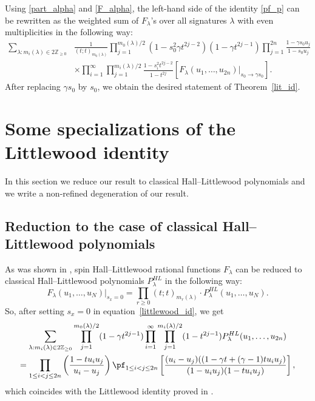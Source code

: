 Using \eqref{part_alpha} and \eqref{F_alpha}, the left-hand side of the identity \eqref{pf_p} can be rewritten as the weighted sum of $F_{\lambda}$'s over all signatures $\lambda$ with even multiplicities in the following way:
\begin{equation*}
\begin{split}
\sum_{\lambda: m_{i}(\lambda) \in 2 \mathbb{Z}_{\geq 0}} &\frac{1}{( t; t)_{m_{0}(\lambda)}} \prod_{j = 1}^{m_{0}(\lambda) / 2} (1 - s_{0}^2 \gamma t^{2j - 2})(1 - \gamma t^{2j-1}) \prod_{j=1}^{2n} \frac{1 - \gamma s_0 u_j}{1 - s_0 u_j}
\\
&\times \prod_{i = 1}^{\infty} \prod_{j = 1}^{m_{i}(\lambda) / 2} \frac{1 - s_{i}^2 t^{2j - 2}}{1 - t^{2j}} \left[F_{\lambda} (u_1, \dots, u_{2n})\Big\vert_{\text{$s_0\to \gamma s_0$}}\right].
\end{split}
\end{equation*}
After replacing $\gamma s_0$ by $s_0$, we obtain the desired statement of Theorem~\ref{lit_id}.

\section{Some specializations of the Littlewood identity} \label{sec: spec}

In this section we reduce our result
to classical Hall--Littlewood polynomials and we write a non-refined degeneration of our result.
\subsection{Reduction to the case of classical Hall--Littlewood polynomials}
As was shown in \cite{Pet21}, spin Hall--Littlewood rational functions $F_{\lambda}$ can be reduced to classical Hall--Littlewood polynomials $P_\lambda^{HL}$ in the following way:
\begin{equation}
F_{\lambda}(u_1, \dots, u_N)\Big\vert_{\text{$s_x=0$}} = \prod_{r\ge0}(t;t)_{m_r(\lambda)}\cdot
P_\lambda^{HL}(u_1,\ldots,u_N).
\end{equation}
So, after setting $ s_x = 0$ in equation~\eqref{littlewood_id}, we get
\begin{multline} \label{class_id}
\sum_{\lambda: m_{i}(\lambda) \in 2 \mathbb{Z}_{\geq 0}}  \prod_{j = 1}^{m_{0}(\lambda) / 2}(1 - \gamma t^{2j-1})\prod_{i = 1}^{\infty} \prod_{j = 1}^{m_{i}(\lambda) / 2} (1 - t^{2j-1}) P_{\lambda}^{HL} (u_1,\ldots,u_{2n})
\\
=
\prod_{1 \leq i<j \leq 2n}
\left(
\frac{1-t u_i u_j}{u_i - u_j}
\right) 
\pf_{1\leq i < j \leq 2n}
\left[
\frac{ (u_i - u_j)((1 - \gamma t+ (\gamma-1)tu_i u_j)}
{(1-u_i u_j) (1-t u_i u_j)}
\right],
\end{multline}
which coincides with the Littlewood identity proved in \cite[Theorem 5]{WZJ16}.

